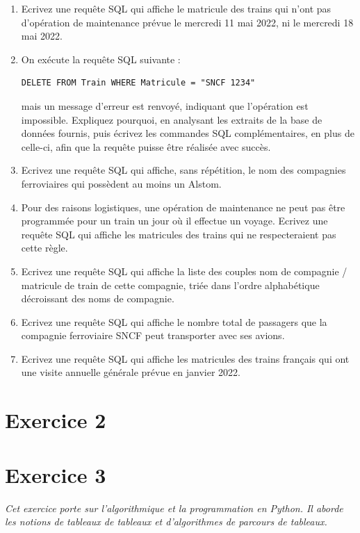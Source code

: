 \documentclass[11pt,a4paper,french,twoside]{PMCours}
\begin{document}
\begin{enumerate}
\item Ecrivez une requête SQL qui affiche le matricule des trains qui n'ont pas d'opération de maintenance prévue le mercredi 11 mai 2022, ni le mercredi 18 mai 2022.
\item On exécute la requête SQL suivante :
\begin{verbatim}
DELETE FROM Train WHERE Matricule = "SNCF 1234"
\end{verbatim} 
mais un message d'erreur est renvoyé, indiquant que l'opération est impossible. Expliquez pourquoi, en analysant les extraits de la base de données fournis, puis écrivez les commandes SQL complémentaires, en plus de celle-ci, afin que la requête puisse être réalisée avec succès.
\item Ecrivez une requête SQL qui affiche, sans répétition, le nom des compagnies ferroviaires qui possèdent au moins un Alstom.
\item Pour des raisons logistiques, une opération de maintenance ne peut pas être programmée pour un train un jour où il effectue un voyage. Ecrivez une requête SQL qui affiche les matricules des trains qui ne respecteraient pas cette règle.
\item Ecrivez une requête SQL qui affiche la liste des couples nom de compagnie / matricule de train de cette compagnie, triée dans l'ordre alphabétique décroissant des noms de compagnie.
\item Ecrivez une requête SQL qui affiche le nombre total de passagers que la compagnie ferroviaire SNCF peut transporter avec ses avions.
\item Ecrivez une requête SQL qui affiche les matricules des trains français qui ont une visite annuelle générale prévue en janvier 2022.
\end{enumerate}

\newpage
\section*{Exercice 2}


\newpage
\section*{Exercice 3}
\emph{Cet exercice porte sur l'algorithmique et la programmation en Python. Il aborde les notions
de tableaux de tableaux et d'algorithmes de parcours de tableaux.}
\end{document}
